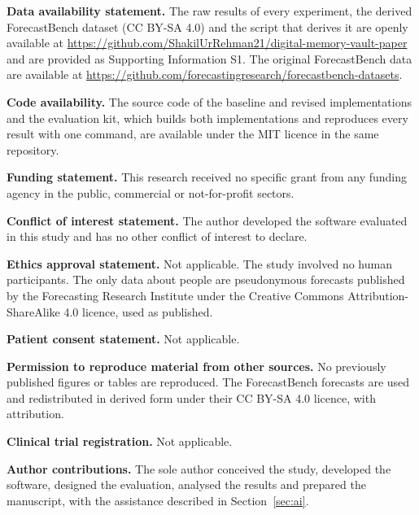 \documentclass[12pt,a4paper]{article}
\begin{document}
{\small
\noindent\textbf{Data availability statement.} The raw results of every experiment, the derived ForecastBench dataset (CC BY-SA 4.0) and the script that derives it are openly available at \url{https://github.com/ShakilUrRehman21/digital-memory-vault-paper} and are provided as Supporting Information S1. The original ForecastBench data are available at \url{https://github.com/forecastingresearch/forecastbench-datasets}.\par\smallskip
\noindent\textbf{Code availability.} The source code of the baseline and revised implementations and the evaluation kit, which builds both implementations and reproduces every result with one command, are available under the MIT licence in the same repository.\par\smallskip
\noindent\textbf{Funding statement.} This research received no specific grant from any funding agency in the public, commercial or not-for-profit sectors.\par\smallskip
\noindent\textbf{Conflict of interest statement.} The author developed the software evaluated in this study and has no other conflict of interest to declare.\par\smallskip
\noindent\textbf{Ethics approval statement.} Not applicable. The study involved no human participants. The only data about people are pseudonymous forecasts published by the Forecasting Research Institute under the Creative Commons Attribution-ShareAlike 4.0 licence, used as published.\par\smallskip
\noindent\textbf{Patient consent statement.} Not applicable.\par\smallskip
\noindent\textbf{Permission to reproduce material from other sources.} No previously published figures or tables are reproduced. The ForecastBench forecasts are used and redistributed in derived form under their CC BY-SA 4.0 licence, with attribution.\par\smallskip
\noindent\textbf{Clinical trial registration.} Not applicable.\par\smallskip
\noindent\textbf{Author contributions.} The sole author conceived the study, developed the software, designed the evaluation, analysed the results and prepared the manuscript, with the assistance described in Section~\ref{sec:ai}.\par
}
\clearpage

\end{document}
